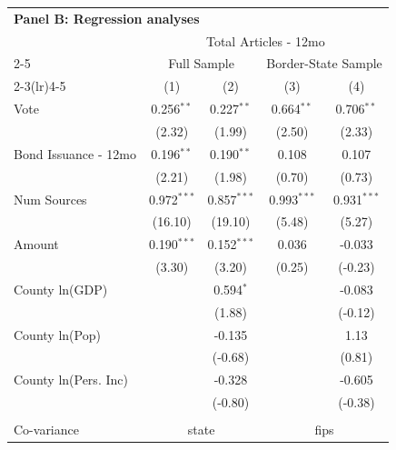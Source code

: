 \begingroup
\centering
\begin{tabular*}{\textwidth}{@{\extracolsep{\fill}}lcccc}
\multicolumn{5}{l}{\textbf{Panel B: Regression analyses}}\\

\addlinespace
   \toprule
    & \multicolumn{4}{c}{Total Articles - 12mo}\\
   \cmidrule(lr){2-5}
    & \multicolumn{2}{c}{Full Sample} & \multicolumn{2}{c}{Border-State Sample}\\
   \cmidrule(lr){2-3}\cmidrule(lr){4-5}
                        & (1)           & (2)           & (3)           & (4)\\  
   \midrule 
   Vote                 & 0.256$^{**}$  & 0.227$^{**}$  & 0.664$^{**}$  & 0.706$^{**}$\\   
                        & (2.32)        & (1.99)        & (2.50)        & (2.33)\\   
   Bond Issuance - 12mo & 0.196$^{**}$  & 0.190$^{**}$  & 0.108         & 0.107\\   
                        & (2.21)        & (1.98)        & (0.70)       & (0.73)\\   
   Num Sources          & 0.972$^{***}$ & 0.857$^{***}$ & 0.993$^{***}$ & 0.931$^{***}$\\   
                        & (16.10)        & (19.10)        & (5.48)        & (5.27)\\   
   Amount               & 0.190$^{***}$ & 0.152$^{***}$ & 0.036         & -0.033\\   
                        & (3.30)        & (3.20)        & (0.25)       & (-0.23)\\   
   County ln(GDP)       &               & 0.594$^{*}$   &               & -0.083\\   
                        &               & (1.88)        &               & (-0.12)\\   
   County ln(Pop)       &               & -0.135        &               & 1.13\\   
                        &               & (-0.68)      &               & (0.81)\\   
   County ln(Pers. Inc) &               & -0.328        &               & -0.605\\   
                        &               & (-0.80)      &               & (-0.38)\\   
    \\
   Co-variance & \multicolumn{2}{c}{state} & \multicolumn{2}{c}{fips} \\ 

\end{tabular*}
